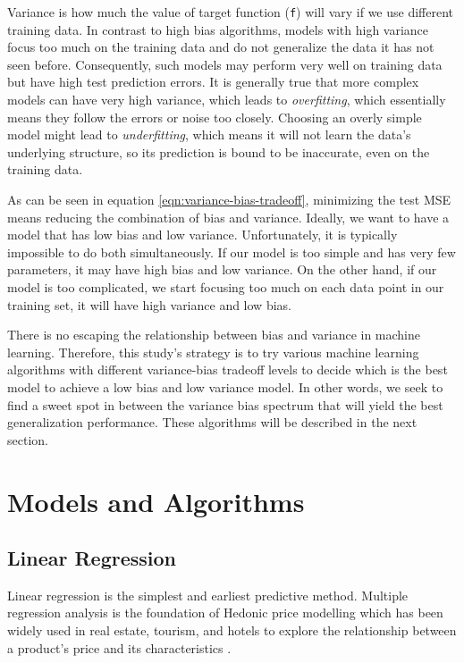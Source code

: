 
Variance is how much the value of target function (\texttt{f}) will vary if we
use different training data. In contrast to high bias algorithms, models with
high variance focus too much on the training data and do not generalize the data
it has not seen before. Consequently, such models may perform very well on
training data but have high test prediction errors.  It is generally true that
more complex models can have very high variance, which leads to
\textit{overfitting}, which essentially means they follow the errors or noise
too closely.  Choosing an overly simple model might lead to
\textit{underfitting}, which means it will not learn the data's underlying
structure, so its prediction is bound to be inaccurate, even on the training
data.

As can be seen in equation \ref{eqn:variance-bias-tradeoff}, minimizing the test
MSE means reducing the combination of bias and variance. Ideally, we want to
have a model that has low bias and low variance. Unfortunately, it is typically
impossible to do both simultaneously. If our model is too simple and has very
few parameters, it may have high bias and low variance. On the other hand, if
our model is too complicated, we start focusing too much on each data point in
our training set, it will have high variance and low bias.

There is no escaping the relationship between bias and variance in machine
learning. Therefore, this study's strategy is to try various machine learning algorithms
with different variance-bias tradeoff levels to decide which is the best
model to achieve a low bias and low variance model. In other words, we seek to
find a sweet spot in between the variance bias spectrum that will yield the best
generalization performance. These algorithms will be described in the next
section.

\section{Models and Algorithms}

\subsection{Linear Regression}
\label{linear-regression}

Linear regression is the simplest and earliest predictive method.
Multiple regression analysis is the foundation of Hedonic price
modelling which has been widely used in real estate, tourism, and hotels to
explore the relationship between a product's price and its characteristics
\parencite{rosen1974hedonic}.

